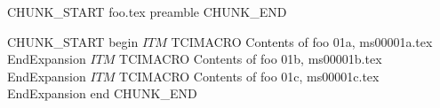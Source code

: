 CHUNK_START
foo.tex preamble
CHUNK_END

CHUNK_START
begin
$ITM$
TCIMACRO
Contents of foo 01a, ms00001a.tex
EndExpansion
$ITM$
TCIMACRO
Contents of foo 01b, ms00001b.tex
EndExpansion
$ITM$
TCIMACRO
Contents of foo 01c, ms00001c.tex
EndExpansion
end
CHUNK_END

